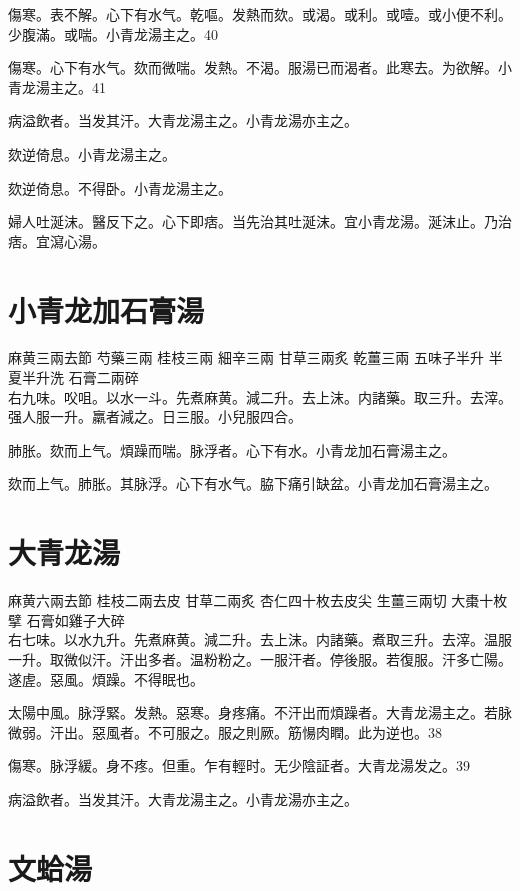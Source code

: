 傷寒。表不解。心下有水气。乾嘔。发熱而欬。或渴。或利。或噎。或小便不利。少腹滿。或喘。小青龙湯主之。40

傷寒。心下有水气。欬而微喘。发熱。不渴。服湯已而渴者。此寒去。为欲解。小青龙湯主之。41

病溢飲者。当发其汗。大青龙湯主之。小青龙湯亦主之。

欬逆倚息。小青龙湯主之。{\wuben}

欬逆倚息。不得卧。小青龙湯主之。{\dengben}

婦人吐涎沫。醫反下之。心下即痞。当先治其吐涎沫。宜小青龙湯。涎沫止。乃治痞。宜瀉心湯。

\section{小青龙加石膏湯}

麻黄{\scriptsize 三兩去節} 芍藥{\scriptsize 三兩} 桂枝{\scriptsize 三兩} 細辛{\scriptsize 三兩} 甘草{\scriptsize 三兩炙} 乾薑{\scriptsize 三兩} 五味子{\scriptsize 半升} 半夏{\scriptsize 半升洗} 石膏{\scriptsize 二兩碎}\\
右九味。㕮咀。以水一斗。先煮麻黄。減二升。去上沫。内諸藥。取三升。去滓。强人服一升。羸者減之。日三服。小兒服四合。

肺胀。欬而上气。煩躁而喘。脉浮者。心下有水。小青龙加石膏湯主之。

欬而上气。肺胀。其脉浮。心下有水气。脇下痛引缺盆。小青龙加石膏湯主之。

\section{大青龙湯}

麻黄{\scriptsize 六兩去節} 桂枝{\scriptsize 二兩去皮} 甘草{\scriptsize 二兩炙} 杏仁{\scriptsize 四十枚去皮尖} 生薑{\scriptsize 三兩切} 大棗{\scriptsize 十枚擘} 石膏{\scriptsize 如雞子大碎}\\
右七味。以水九升。先煮麻黄。減二升。去上沫。内諸藥。煮取三升。去滓。温服一升。取微似汗。汗出多者。温粉粉之。一服汗者。停後服。若復服。汗多亡陽。遂虗。惡風。煩躁。不得眠也。

太陽中風。脉浮緊。发熱。惡寒。身疼痛。不汗出而煩躁者。大青龙湯主之。若脉微弱。汗出。惡風者。不可服之。服之則厥。筋愓肉瞤。此为逆也。38

傷寒。脉浮緩。身不疼。但重。乍有輕时。无少陰証者。大青龙湯发之。39

病溢飲者。当发其汗。大青龙湯主之。小青龙湯亦主之。

\section{文蛤湯}

